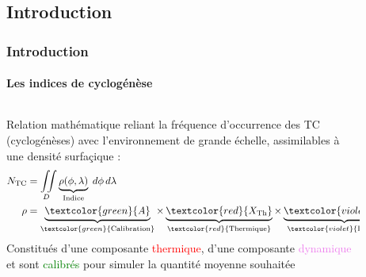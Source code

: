 \documentclass[aspectratio=169, usepdftitle=false, xcolor={dvipsnames}, 9pt,table]{beamer}
\begin{document}
\subsection{Introduction}
\begin{frame}[t]
    \frametitle{Introduction}
    \framesubtitle{Les indices de cyclogénèse}
    \footnotesize
    \begin{columns}
        \begin{column}{0.7\textwidth}
            \vspace{-3em}
            \begin{definition}[Définition]
                \alert{Relation} mathématique reliant la fréquence d'occurrence des TC (cyclogénèses) avec l'environnement de grande échelle, assimilables à une densité
                surfaçique :
                \begin{align*}
                    N_{\text{TC}} &= \iint\limits_{D} \underbrace{\rho(\phi, \lambda)}_{\text{Indice}} \; d\phi \, d\lambda \\
                    \rho &= \underbrace{\vphantom{X_{\text{Dyn}}}\textcolor{green}{A}}_{\textcolor{green}{\text{Calibration}}} \times
                    \underbrace{\vphantom{X_{\text{Dyn}}}\textcolor{red}{X_{\text{Th}}}}_{\textcolor{red}{\text{Thermique}}} \times
                    \underbrace{\textcolor{violet}{X_{\text{Dyn}}}}_{\textcolor{violet}{\text{Dynamique}}}
                \end{align*}
                Constitués d'une composante \textcolor{red}{thermique}, d'une composante \textcolor{violet}{dynamique} et sont \textcolor{green}{calibrés} pour simuler la
                quantité moyenne souhaitée 
            \end{definition}
            \vspace{2em}
        \end{column}
        \begin{column}{0.3\textwidth}
            \vspace{-7em}
            \begin{figure}
                \centering

\end{figure}
\end{column}
\end{columns}
\end{frame}
\end{document}
